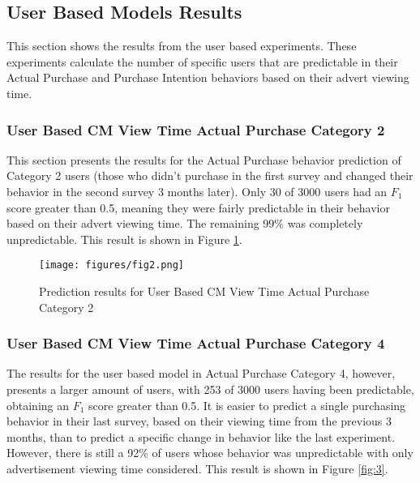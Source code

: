 \documentclass[review]{elsarticle}
\begin{document}
\subsection{User Based Models Results}
\label{user_base_results}

This section shows the results from the user based experiments. These experiments calculate the number of specific users that are predictable in their Actual Purchase and Purchase Intention behaviors based on their advert viewing time.

\subsubsection{User Based CM View Time \textperiodcentered  Actual Purchase Category 2}
\label{user_ap_2}

This section presents the results for the Actual Purchase behavior prediction of Category 2 users (those who didn't purchase in the first survey and changed their behavior in the second survey 3 months later). Only 30 of 3000 users had an \(F_{1}\) score greater than 0.5, meaning they were fairly predictable in their behavior based on their advert viewing time. The remaining 99\% was completely unpredictable. This result is shown in Figure \ref{fig:2}.

\begin{figure}
\centering
\texttt{[image: figures/fig2.png]}
\caption{Prediction results for User Based CM View Time \textperiodcentered  Actual Purchase Category 2}
\label{fig:2}
\end{figure}


\subsubsection{User Based CM View Time \textperiodcentered  Actual Purchase Category 4}
\label{user_ap_4}

The results for the user based model in Actual Purchase Category 4, however, presents a larger amount of users, with 253 of 3000 users having been predictable, obtaining an \(F_{1}\) score greater than 0.5. It is easier to predict a single purchasing behavior in their last survey, based on their viewing time from the previous 3 months, than to predict a specific change in behavior like the last experiment. However, there is still a 92\% of users whose behavior was unpredictable with only advertisement viewing time considered. This result is shown in Figure \ref{fig:3}. 
\end{document}
